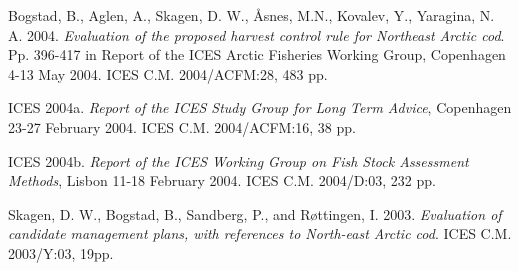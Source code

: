 \documentclass[12pt,twoside,a4paper]{article}
\begin{document}
\begin{mybib}

\hypertarget{bogstad}{}
Bogstad, B., Aglen, A., Skagen, D. W., Åsnes, M.N., Kovalev, Y., Yaragina, 
N. A. 2004. \emph{Evaluation of the proposed harvest control rule for
Northeast Arctic cod}. Pp. 396-417 in Report of the ICES Arctic Fisheries Working Group,
Copenhagen 4-13 May 2004. ICES C.M. 2004/ACFM:28, 483 pp.

\hypertarget{ices2004a}{}
ICES 2004a. \emph{Report of the ICES Study Group for Long Term Advice}, 
Copenhagen 23-27 February 2004. ICES C.M. 2004/ACFM:16, 38 pp.

\hypertarget{ices2004b}{}
ICES 2004b. \emph{Report of the ICES Working Group on Fish Stock Assessment 
Methods}, Lisbon 11-18 February 2004. ICES C.M. 2004/D:03, 232 pp.

\hypertarget{skagen}{}
Skagen, D. W., Bogstad, B., Sandberg, P., and Røttingen, I. 2003. 
\emph{Evaluation of candidate management plans, with references to North-east 
Arctic cod}. ICES C.M. 2003/Y:03, 19pp.



\end{mybib}
\end{document}
